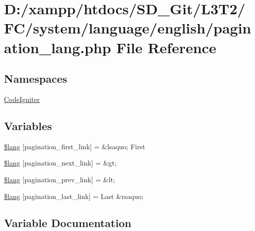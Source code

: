 \hypertarget{pagination__lang_8php}{}\section{D\+:/xampp/htdocs/\+S\+D\+\_\+\+Git/\+L3\+T2/\+F\+C/system/language/english/pagination\+\_\+lang.php File Reference}
\label{pagination__lang_8php}
\subsection*{Namespaces}
\begin{DoxyCompactItemize}
\item 
 \hyperlink{namespace_code_igniter}{Code\+Igniter}
\end{DoxyCompactItemize}
\subsection*{Variables}
\begin{DoxyCompactItemize}
\item 
\hyperlink{pagination__lang_8php_a9786c3ca317374647c440f713c686d49}{\$lang} \mbox{[}\textquotesingle{}pagination\+\_\+first\+\_\+link\textquotesingle{}\mbox{]} = \textquotesingle{}\&lsaquo; First\textquotesingle{}
\item 
\hyperlink{pagination__lang_8php_a485f808a96ff78250ab760d638f3ddc7}{\$lang} \mbox{[}\textquotesingle{}pagination\+\_\+next\+\_\+link\textquotesingle{}\mbox{]} = \textquotesingle{}\&gt;\textquotesingle{}
\item 
\hyperlink{pagination__lang_8php_a5388708db9e549b8ec5ec4cd49073c84}{\$lang} \mbox{[}\textquotesingle{}pagination\+\_\+prev\+\_\+link\textquotesingle{}\mbox{]} = \textquotesingle{}\&lt;\textquotesingle{}
\item 
\hyperlink{pagination__lang_8php_aa4f66cf3f9c7c4b479f01776761faea6}{\$lang} \mbox{[}\textquotesingle{}pagination\+\_\+last\+\_\+link\textquotesingle{}\mbox{]} = \textquotesingle{}Last \&rsaquo;\textquotesingle{}
\end{DoxyCompactItemize}


\subsection{Variable Documentation}
\hypertarget{pagination__lang_8php_a9786c3ca317374647c440f713c686d49}{}
